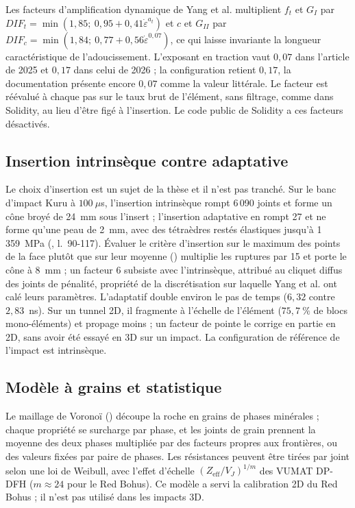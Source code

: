 Les facteurs d'amplification dynamique de Yang et al. multiplient $f_t$ et $G_I$ par $DIF_t = \min(1{,}85;\ 0{,}95 + 0{,}41\dot\varepsilon^{a_t})$ et $c$ et $G_{II}$ par $DIF_c = \min(1{,}84;\ 0{,}77 + 0{,}56\dot\varepsilon^{0{,}07})$, ce qui laisse invariante la longueur caractéristique de l'adoucissement. L'exposant en traction vaut $0{,}07$ dans l'article de 2025 et $0{,}17$ dans celui de 2026 ; la configuration retient $0{,}17$, la documentation présente encore $0{,}07$ comme la valeur littérale. Le facteur est réévalué à chaque pas sur le taux brut de l'élément, sans filtrage, comme dans Solidity, au lieu d'être figé à l'insertion. Le code public de Solidity a ces facteurs désactivés.

\subsection{Insertion intrinsèque contre adaptative}
\label{sec-insertion}

Le choix d'insertion est un sujet de la thèse et il n'est pas tranché. Sur le banc d'impact Kuru à $100~\mu$s, l'insertion intrinsèque rompt 6\,090 joints et forme un cône broyé de 24~mm sous l'insert ; l'insertion adaptative en rompt 27 et ne forme qu'une peau de 2~mm, avec des tétraèdres restés élastiques jusqu'à 1\,359~MPa (, l.~90-117). Évaluer le critère d'insertion sur le maximum des points de la face plutôt que sur leur moyenne () multiplie les ruptures par 15 et porte le cône à 8~mm ; un facteur 6 subsiste avec l'intrinsèque, attribué au cliquet diffus des joints de pénalité, propriété de la discrétisation sur laquelle Yang et al. ont calé leurs paramètres. L'adaptatif double environ le pas de temps ($6{,}32$ contre $2{,}83$~ns). Sur un tunnel 2D, il fragmente à l'échelle de l'élément ($75{,}7~\%$ de blocs mono-éléments) et propage moins ; un facteur de pointe le corrige en partie en 2D, sans avoir été essayé en 3D sur un impact. La configuration de référence de l'impact est intrinsèque.

\subsection{Modèle à grains et statistique}

Le maillage de Voronoï () découpe la roche en grains de phases minérales ; chaque propriété se surcharge par phase, et les joints de grain prennent la moyenne des deux phases multipliée par des facteurs propres aux frontières, ou des valeurs fixées par paire de phases. Les résistances peuvent être tirées par joint selon une loi de Weibull, avec l'effet d'échelle $(Z_\text{eff}/V_J)^{1/m}$ des VUMAT DP-DFH ($m \approx 24$ pour le Red Bohus). Ce modèle a servi la calibration 2D du Red Bohus ; il n'est pas utilisé dans les impacts 3D.

